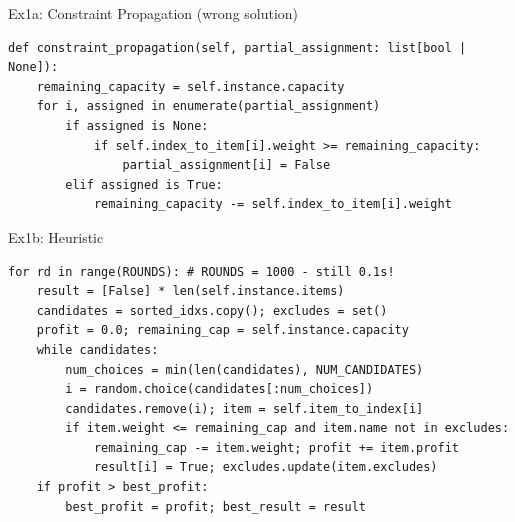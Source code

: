 \documentclass[fleqn,11pt,aspectratio=169]{beamer}
\begin{document}
\begin{frame}[t, fragile]{Ex1a: Constraint Propagation (wrong solution)}

\begin{verbatim}
def constraint_propagation(self, partial_assignment: list[bool | None]):
	remaining_capacity = self.instance.capacity
	for i, assigned in enumerate(partial_assignment)
		if assigned is None:
			if self.index_to_item[i].weight >= remaining_capacity:
				partial_assignment[i] = False
		elif assigned is True:
			remaining_capacity -= self.index_to_item[i].weight
\end{verbatim}

\end{frame}

\begin{frame}[fragile]{Ex1b: Heuristic}
\begin{verbatim}
for rd in range(ROUNDS): # ROUNDS = 1000 - still 0.1s!
	result = [False] * len(self.instance.items)
	candidates = sorted_idxs.copy(); excludes = set()
	profit = 0.0; remaining_cap = self.instance.capacity
	while candidates:
		num_choices = min(len(candidates), NUM_CANDIDATES)
		i = random.choice(candidates[:num_choices])
		candidates.remove(i); item = self.item_to_index[i]
		if item.weight <= remaining_cap and item.name not in excludes:
			remaining_cap -= item.weight; profit += item.profit
			result[i] = True; excludes.update(item.excludes)
	if profit > best_profit:
		best_profit = profit; best_result = result
\end{verbatim}
\end{frame}
\end{document}
